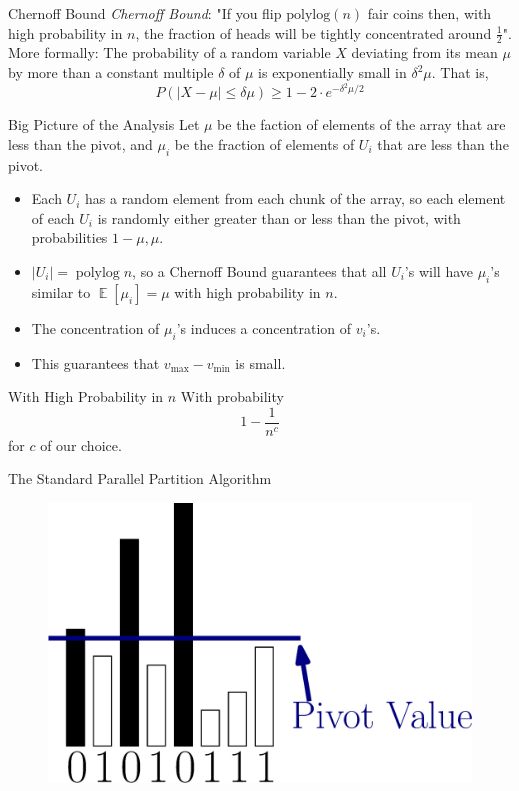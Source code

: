 \documentclass[xcolor=x11names, svgnames, rgb]{beamer}
\newcommand{\polylog}{\operatorname{polylog}}
\def\E{\operatorname{\mathbb{E}}}
\begin{document}
\begin{frame}[t]{Chernoff Bound}
	\vspace{0.5cm}
	\emph{Chernoff Bound}: "If you flip $\text{polylog}(n)$ fair coins then, with high
	probability in $n$, the fraction of heads will be tightly concentrated around
	$\frac{1}{2}$".\\

	\vspace{0.5cm}
	More formally:
	The probability of a random variable $X$ deviating from its mean $\mu$ by more than a constant multiple $\delta$ of $\mu$ is exponentially small in $\delta^2 \mu$. That is, 
	$$P(|X - \mu | \le \delta \mu ) \ge 1- 2\cdot e^{-\delta^2 \mu /2} $$

\end{frame}


\begin{frame}[t]{Big Picture of the Analysis}
	Let $\mu$ be the faction of elements of the array that are less than the pivot, and $\mu_i$ be the fraction of elements of $U_i$ that are less than the pivot.
	\begin{itemize}
		\item Each $U_i$ has a random element from each chunk of the array, so each
			element of each $U_i$ is randomly either greater than or less than the
			pivot, with probabilities $1-\mu, \mu$.
		\item $|U_i| = \polylog n$, so a Chernoff Bound guarantees that all $U_i$'s
			will have $\mu_i$'s similar to $\E[\mu_i] = \mu$ with high probability in $n$.
		\item The concentration of $\mu_i$'s induces a concentration of $v_i$'s. 
		\item This guarantees that $v_{\max} - v_{\min}$ is small. 
	\end{itemize}
\end{frame}

\begin{frame}[t]{With High Probability in $n$}
With probability 	
	$$1- \frac{1}{n^c}$$
	for $c$ of our choice.
\end{frame}


\begin{frame}[t]{The Standard Parallel Partition Algorithm }
	\begin{figure}
		\includegraphics[width=\linewidth]{imgs/standardAlg/standardAlg1.eps}
	\end{figure}
\end{frame}
\end{document}
